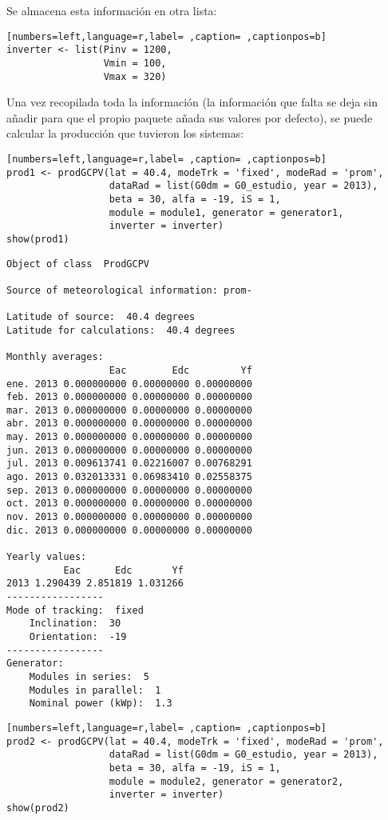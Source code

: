 Se almacena esta información en otra lista:
\begin{lstlisting}[numbers=left,language=r,label= ,caption= ,captionpos=b]
inverter <- list(Pinv = 1200,
                 Vmin = 100,
                 Vmax = 320)
\end{lstlisting}

Una vez recopilada toda la información (la información que falta se deja sin añadir para que el propio paquete añada sus valores por defecto), se puede calcular la producción que tuvieron los sistemas:

\begin{lstlisting}[numbers=left,language=r,label= ,caption= ,captionpos=b]
prod1 <- prodGCPV(lat = 40.4, modeTrk = 'fixed', modeRad = 'prom',
                  dataRad = list(G0dm = G0_estudio, year = 2013),
                  beta = 30, alfa = -19, iS = 1,
                  module = module1, generator = generator1,
                  inverter = inverter)
show(prod1)
\end{lstlisting}

\begin{verbatim}
Object of class  ProdGCPV 

Source of meteorological information: prom- 

Latitude of source:  40.4 degrees
Latitude for calculations:  40.4 degrees

Monthly averages:
                  Eac        Edc         Yf
ene. 2013 0.000000000 0.00000000 0.00000000
feb. 2013 0.000000000 0.00000000 0.00000000
mar. 2013 0.000000000 0.00000000 0.00000000
abr. 2013 0.000000000 0.00000000 0.00000000
may. 2013 0.000000000 0.00000000 0.00000000
jun. 2013 0.000000000 0.00000000 0.00000000
jul. 2013 0.009613741 0.02216007 0.00768291
ago. 2013 0.032013331 0.06983410 0.02558375
sep. 2013 0.000000000 0.00000000 0.00000000
oct. 2013 0.000000000 0.00000000 0.00000000
nov. 2013 0.000000000 0.00000000 0.00000000
dic. 2013 0.000000000 0.00000000 0.00000000

Yearly values:
          Eac      Edc       Yf
2013 1.290439 2.851819 1.031266
-----------------
Mode of tracking:  fixed 
    Inclination:  30 
    Orientation:  -19 
-----------------
Generator:
    Modules in series:  5 
    Modules in parallel:  1 
    Nominal power (kWp):  1.3
\end{verbatim}

\begin{lstlisting}[numbers=left,language=r,label= ,caption= ,captionpos=b]
prod2 <- prodGCPV(lat = 40.4, modeTrk = 'fixed', modeRad = 'prom',
                  dataRad = list(G0dm = G0_estudio, year = 2013),
                  beta = 30, alfa = -19, iS = 1,
                  module = module2, generator = generator2,
                  inverter = inverter)
show(prod2)
\end{lstlisting}

